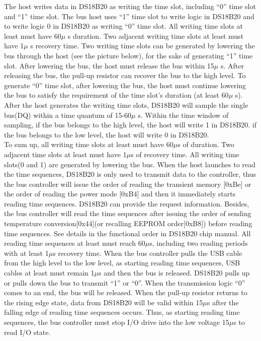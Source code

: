 The host writes data in DS18B20 as writing the time slot, including “0” time slot and “1” time slot. The bus host uses “1” time slot to write logic in DS18B20 and to write logic 0 in DS18B20 as writing “0” time slot. All writing time slots at least must have 60$\mu$ s duration. Two adjacent writing time slots at least must have 1$\mu$ s recovery time. Two writing time slots can be generated by lowering the bus through the host (see the picture below), for the sake of generating “1” time slot. 
After lowering the bus, the host must release the bus within 15$\mu$ s. After releasing the bus, the pull-up resistor can recover the bus to the high level. To generate “0” time slot, after lowering the bus, the host must continue lowering the bus to satisfy the requirement of the time slot’s duration (at least 60$\mu$ s). 
After the host generates the writing time slots, DS18B20 will sample the single bus(DQ) within a time quantum of 15-60$\mu$ s. Within the time window of sampling, if the bus belongs to the high level, the host will write 1 in DS18B20. if the bus belongs to the low level, the host will write 0 in DS18B20. 
\\
To sum up, all writing time slots at least must have 60$\mu$s of duration. Two adjacent time slots at least must have 1$\mu$s of recovery time. All writing time slots(0 and 1) are generated by lowering the bus. 
When the host launches to read the time sequences, DS18B20 is only used to transmit data to the controller, thus the bus controller will issue the order of reading the transient memory [0xBe] or the order of reading the power mode [0xB4] and then it immediately starts reading time sequences. DS18B20 can provide the request information. Besides, the bus controller will read the time sequences after issuing the order of sending temperature conversion[0x44](or recalling EEPROM order[0xB8]) before reading time sequences. See details in the functional order in DS18B20 chip manual. 
All reading time sequences at least must reach 60$\mu$s, including two reading periods with at least 1$\mu$s recovery time. When the bus controller pulls the USB cable from the high level to the low level, as starting reading time sequences, USB cables at least must remain 1$\mu$s and then the bus is released. DS18B20 pulls up or pulls down the bus to transmit “1” or “0”. When the transmission logic “0” comes to an end, the bus will be released. When the pull-up resistor returns to the rising edge state, data from DS18B20 will be valid within 15$\mu$s after the falling edge of reading time sequences occurs. Thus, as starting reading time sequences, the bus controller must stop I/O drive into the low voltage 15$\mu$s to read I/O state. 
\\

